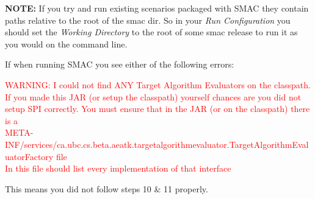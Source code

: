 \documentclass[manual.tex]{subfiles}
\begin{document}
\textbf{NOTE:} If you try and run existing scenarios packaged with SMAC they contain paths relative to the root of the smac dir. So in your \emph{Run Configuration} you should set the \emph{Working Directory} to the root of some smac release to run it as you would on the command line.


If when running SMAC you see either of the following errors:

\textcolor{red}{
WARNING: I could not find ANY Target Algorithm Evaluators on the classpath.\\
 If you made this JAR (or setup the classpath) yourself chances are you did not setup SPI correctly.
 You must ensure that in the JAR (or on the classpath) there is a \\
  META-INF/services/ca.ubc.cs.beta.aeatk.targetalgorithmevaluator.TargetAlgorithmEvaluatorFactory file \\
 In this file should list every implementation of that interface 
}
\vspace{10pt}

This means you did not follow steps 10 \& 11 properly.
\end{document}
